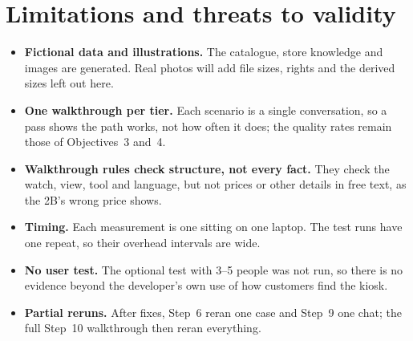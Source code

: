 \documentclass[11pt,a4paper]{article}
\begin{document}
\section{Limitations and threats to validity}\label{sec:limits}
\begin{itemize}
  \item \textbf{Fictional data and illustrations.} The catalogue, store knowledge and images are generated. Real photos
        will add file sizes, rights and the derived sizes left out here.
  \item \textbf{One walkthrough per tier.} Each scenario is a single conversation, so a pass shows the path works, not
        how often it does; the quality rates remain those of Objectives~3 and~4.
  \item \textbf{Walkthrough rules check structure, not every fact.} They check the watch, view, tool and language, but
        not prices or other details in free text, as the 2B's wrong price shows.
  \item \textbf{Timing.} Each measurement is one sitting on one laptop. The test runs have one repeat, so their overhead
        intervals are wide.
  \item \textbf{No user test.} The optional test with 3--5 people was not run, so there is no evidence beyond the
        developer's own use of how customers find the kiosk.
  \item \textbf{Partial reruns.} After fixes, Step~6 reran one case and Step~9 one chat; the full Step~10 walkthrough
        then reran everything.
\end{itemize}

\end{document}
